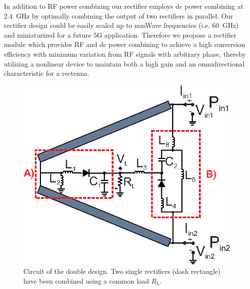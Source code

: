 \documentclass[journal]{IEEEtran}
\begin{document}
In addition to RF power combining our rectifier employs dc power combining at $2.4$~GHz by optimally combining the output of two rectifiers in parallel. 
%
 Our rectifier design could be easily scaled up to mmWave frequencies (i.e. $60$~GHz) and miniaturized for a future 5G application.  
%
Therefore we propose a rectifier module which provides RF and dc power combining to achieve a high conversion efficiency with minimum variation from RF signals with arbitrary phase, thereby utilizing a nonlinear device to maintain both a high gain and an omnidirectional characteristic for a rectenna.
%



\begin{figure}[t]
\centering
\includegraphics[width=0.8\columnwidth]{Figures/Fig2.eps}
\caption{Circuit of the double design. Two single rectifiers (dash rectangle) have been combined using a common load $R_\text{L}$.}
\label{fig:2}
\end{figure}
\end{document}
